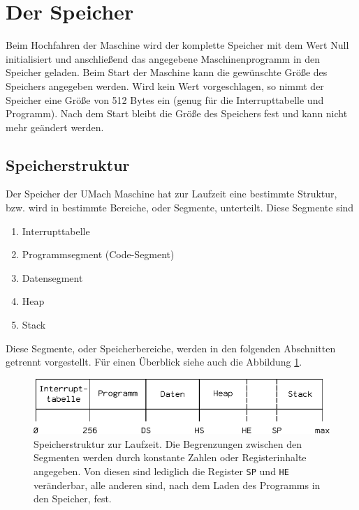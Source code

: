 \section{Der Speicher}
\label{sec:Speicher}

Beim Hochfahren der Maschine wird der komplette Speicher mit dem Wert Null
initialisiert und anschließend das angegebene Maschinenprogramm in den Speicher
geladen. Beim Start der Maschine kann die gewünschte Größe des Speichers
angegeben werden. Wird kein Wert vorgeschlagen, so nimmt der Speicher eine Größe
von 512 Bytes ein (genug für die Interrupttabelle und Programm). Nach dem Start
bleibt die Größe des Speichers fest und kann nicht mehr geändert werden.


\subsection{Speicherstruktur}
\label{subsec:Speicherstruktur}

Der Speicher der UMach Maschine hat zur Laufzeit eine bestimmte Struktur, bzw.
wird in bestimmte Bereiche, oder Segmente, unterteilt. Diese
Segmente sind
\begin{enumerate}
 \item Interrupttabelle
 \item Programmsegment (Code-Segment)
 \item Datensegment
 \item Heap
 \item Stack
\end{enumerate}

Diese Segmente, oder Speicherbereiche, werden in den folgenden Abschnitten
getrennt vorgestellt. Für einen Überblick siehe auch die Abbildung
\ref{fig:Speicherstruktur}.

\begin{figure}[htp]
 \centering
 \includegraphics{./img/UMach-Speicherstruktur}
 \caption[Speicherstruktur]
         {Speicherstruktur zur Laufzeit. Die Begrenzungen zwischen den
          Segmenten werden durch konstante Zahlen oder Registerinhalte
          angegeben. Von diesen sind lediglich die Register \texttt{SP}
          und \texttt{HE} veränderbar, alle anderen sind, nach dem Laden des
          Programms in den Speicher, fest.}
 \label{fig:Speicherstruktur}
\end{figure}



